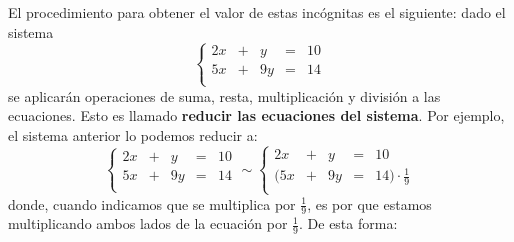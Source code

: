 \documentclass[12pt]{report}
\theoremstyle{largebreak}
\begin{document}
    El procedimiento para obtener el valor de estas incógnitas es el siguiente: dado el sistema
    \begin{equation*}
        \left\{
            \begin{array}{ccccc}
                2x & + & y & = & 10 \\
                5x & + & 9y & = & 14 \\
            \end{array}
        \right.
    \end{equation*}
    se aplicarán operaciones de suma, resta, multiplicación y división a las ecuaciones. Esto es llamado \textbf{reducir las ecuaciones del sistema}. Por ejemplo, el sistema anterior lo podemos reducir a:
    \begin{equation*}
        \left\{
            \begin{array}{ccccc}
                2x & + & y & = & 10 \\
                5x & + & 9y & = & 14 \\
            \end{array}
        \right.\sim \left\{
            \begin{array}{ccccl}
                2x & + & y & = & 10 \\
                (5x & + & 9y & = & 14)\cdot\frac{1}{9} \\
            \end{array}
        \right.
    \end{equation*}
    donde, cuando indicamos que se multiplica por $\frac{1}{9}$, es por que estamos multiplicando ambos lados de la ecuación por $\frac{1}{9}$. De esta forma:
\end{document}
